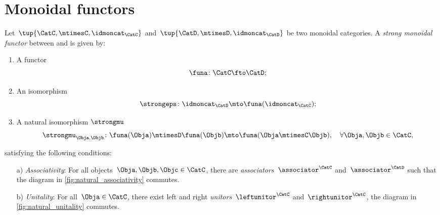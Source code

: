 

\section{Monoidal functors}
\label{sec:monoidal-functors}
\begin{ctdefinition}
    \label{def:strong-monoidal-functor}
    Let~$\tup{\CatC,\mtimesC,\idmoncat_{\CatC}}$ and~$\tup{\CatD,\mtimesD,\idmoncat_{\CatD}}$ be two monoidal categories.
    A \emph{strong monoidal functor} between \CatC and \CatD is given by:
    \begin{enumerate}
        \item A functor
        \begin{equation}
            \funa \colon \CatC \fto \CatD;
        \end{equation}
        \item An isomorphism
        \begin{equation}
            \strongeps\colon \idmoncat_{\CatD}\mto \funa(\idmoncat_{\CatC});
        \end{equation}
        \item A natural isomorphism $\strongmu$
        \begin{equation}
            \strongmu_{\Obja,\Objb}\colon \funa(\Obja)\mtimesD \funa(\Objb) \mto \funa(\Obja \mtimesC \Objb),\quad \forall \Obja,\Objb\in \CatC,
        \end{equation}
    \end{enumerate}
    satisfying the following conditions:
    \begin{enumerate}
        \item[a)] \emph{Associativity}: For all objects~$\Obja,\Objb,\Objc\in \CatC$,
        there are  \emph{associators}~$\associator^\CatC$ and~$\associator^\CatD$ such that
        the diagram in \cref{fig:natural_associativity} commutes.
        \item[b)] \emph{Unitality}: For all~$\Obja\in \CatC$, there exist left and right \emph{unitors}~$\leftunitor^\CatC$ and~$\rightunitor^\CatC$, the diagram in 
        \cref{fig:natural_unitality} commutes.
    \end{enumerate}
\end{ctdefinition}
